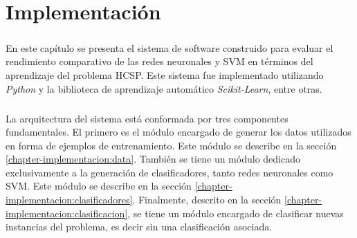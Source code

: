 \chapter{Implementación} \label{chapter-implementation}

\paragraph{} En este capítulo se presenta el sistema de software construido para evaluar el rendimiento comparativo de las redes neuronales y SVM en términos del aprendizaje del problema HCSP. Este sistema fue implementado utilizando \textit{Python} y la biblioteca de aprendizaje automático \textit{Scikit-Learn}, entre otras.

\paragraph{} La arquitectura del sistema está conformada por tres componentes fundamentales. El primero es el módulo encargado de generar los datos utilizados en forma de ejemplos de entrenamiento. Este módulo se describe en la sección \ref{chapter-implementacion:data}. También se tiene un módulo dedicado exclusivamente a la generación de clasificadores, tanto redes neuronales como SVM. Este módulo se describe en la sección \ref{chapter-implementacion:clasificadores}. Finalmente, descrito en la sección \ref{chapter-implementacion:clasificacion}, se tiene un módulo encargado de clasificar nuevas instancias del problema, es decir sin una clasificación asociada.






